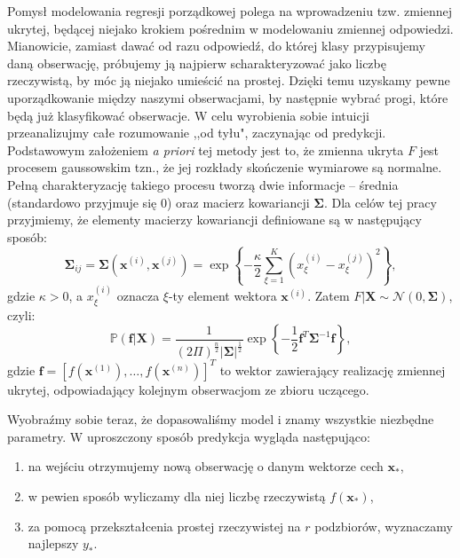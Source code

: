 \documentclass{mini}
\begin{document}
Pomysł modelowania regresji porządkowej polega na wprowadzeniu tzw. zmiennej ukrytej, będącej niejako krokiem pośrednim w modelowaniu zmiennej odpowiedzi. Mianowicie, zamiast dawać od razu odpowiedź, do której klasy przypisujemy daną obserwację, próbujemy ją najpierw scharakteryzować jako liczbę rzeczywistą, by móc ją niejako umieścić na prostej. Dzięki temu uzyskamy pewne uporządkowanie między naszymi obserwacjami, by następnie wybrać progi, które będą już klasyfikować obserwacje. W celu wyrobienia sobie intuicji przeanalizujmy całe rozumowanie ,,od tyłu", zaczynając od predykcji. Podstawowym założeniem \textit{a priori} tej metody jest to, że zmienna ukryta $F$ jest procesem gaussowskim tzn., że jej rozkłady skończenie wymiarowe są normalne. Pełną charakteryzację takiego procesu tworzą dwie informacje -- średnia (standardowo przyjmuje się $0$) oraz macierz kowariancji $\mathbf{\Sigma}$. Dla celów tej pracy przyjmiemy, że elementy macierzy kowariancji definiowane są w następujący sposób:
$$
\mathbf{\Sigma}_{ij} = \mathbf{\Sigma}(\textbf{x}^{(i)}, \textbf{x}^{(j)}) = \exp \left\lbrace -\frac{\kappa}{2}\sum_{\xi=1}^K (x^{(i)}_{\xi} - x^{(j)}_{\xi})^2\right\rbrace,
$$
gdzie $\kappa>0$, a $x^{(i)}_{\xi}$ oznacza $\xi$-ty element wektora $\mathbf{x}^{(i)}$. Zatem $F | \mathbf{X} \sim \mathcal{N}(0, \mathbf{\Sigma})$, czyli:
\begin{equation}\label{apriori}
\mathbb{P}(\mathbf{f} | \mathbf{X}) = \frac{1}{(2\Pi)^{\frac{n}{2}}|\mathbf{\Sigma}|^{\frac{1}{2}}}\exp\left\lbrace -\frac{1}{2}\mathbf{f}^T\mathbf{\Sigma}^{-1}\mathbf{f} \right\rbrace,
\end{equation}
gdzie $\mathbf{f} = [f(\mathbf{x}^{(1)}), \ldots, f(\mathbf{x}^{(n)})]^T$ to wektor zawierający realizację zmiennej ukrytej, odpowiadający kolejnym obserwacjom ze zbioru uczącego.

Wyobraźmy sobie teraz, że dopasowaliśmy model i znamy wszystkie niezbędne parametry. W uproszczony sposób predykcja wygląda następująco: 
\begin{enumerate}
\item na wejściu otrzymujemy nową obserwację o danym wektorze cech $\textbf{x}_{\ast}$,
\item w pewien sposób wyliczamy dla niej liczbę rzeczywistą $f(\mathbf{x}_{\ast})$,
\item  za pomocą przekształcenia prostej rzeczywistej na $r$ podzbiorów, wyznaczamy najlepszy $y_{\ast}$.
\end{enumerate}
\end{document}
